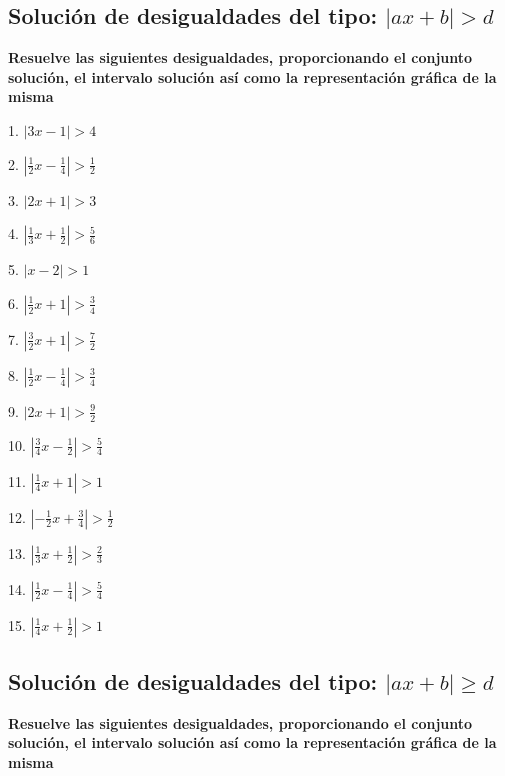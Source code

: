 \documentclass[]{book}
\begin{document}
\subsection{\texorpdfstring{Solución de desigualdades del tipo:
\(|ax+b| >d\)}{Solución de desigualdades del tipo: \textbar{}ax+b\textbar{} \textgreater{}d}}\label{soluciuxf3n-de-desigualdades-del-tipo-axb-d-1}

\textbf{Resuelve las siguientes desigualdades, proporcionando el
conjunto solución, el intervalo solución así como la representación
gráfica de la misma}

\begin{multicols}{3}
1. $|3x-1|>4$

2. $|\frac{1}{2}x-\frac{1}{4}|>\frac{1}{2}$

3. $|2x+1|>3$

4. $|\frac{1}{3}x+\frac{1}{2}|>\frac{5}{6}$

5. $|x-2|>1$

6. $|\frac{1}{2}x+1|>\frac{3}{4}$

7. $|\frac{3}{2}x+1|>\frac{7}{2}$

8. $|\frac{1}{2}x-\frac{1}{4}|>\frac{3}{4}$

9. $|2x+1|>\frac{9}{2}$

10. $|\frac{3}{4}x-\frac{1}{2}|>\frac{5}{4}$

11. $|\frac{1}{4}x+1|>1$

12. $|-\frac{1}{2}x+\frac{3}{4}|>\frac{1}{2}$

13. $|\frac{1}{3}x+\frac{1}{2}|>\frac{2}{3}$

14. $|\frac{1}{2}x-\frac{1}{4}|>\frac{5}{4}$

15. $|\frac{1}{4}x+\frac{1}{2}|>1$
\end{multicols}

\subsection{\texorpdfstring{Solución de desigualdades del tipo:
\(|ax+b| \geq d\)}{Solución de desigualdades del tipo: \textbar{}ax+b\textbar{} \textbackslash{}geq d}}\label{soluciuxf3n-de-desigualdades-del-tipo-axb-geq-d}

\textbf{Resuelve las siguientes desigualdades, proporcionando el
conjunto solución, el intervalo solución así como la representación
gráfica de la misma}
\end{document}
